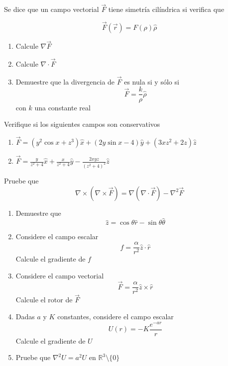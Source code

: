 \np

Se dice que un campo vectorial $\Vec{F}$ tiene simetría cilíndrica si verifica que

\[\Vec{F}(\Vec{r}) = F(\rho)\hat{\rho}\]

\begin{enumerate}[label=\alph*)]
    \item Calcule $\nabla\Vec{F}$
    \item Calcule $\nabla\cdot\Vec{F}$
    \item Demuestre que la divergencia de $\Vec{F}$ es nula si y sólo si
    \[\Vec{F}= \frac{k}{\rho}\hat{\rho}\]
    con $k$ una constante real
\end{enumerate}

\np

Verifique si los siguientes campos son conservativos

\begin{enumerate}[label=\alph*)]
    \item $\Vec{F} = (y^2\cos{x}+z^3)\hat{x} + (2y\sin{x}-4)\hat{y} + (3xz^2+2z)\hat{z}$
    \item $\Vec{F} = \frac{y}{z^2+4}\hat{x} + \frac{x}{z^2+4}\hat{y} - \frac{2xyz}{(z^2+4)^2}\hat{z}$
\end{enumerate}%

\np

Pruebe que 
\[\nabla\times(\nabla\times\Vec{F}) = \nabla(\nabla\cdot\Vec{F})-\nabla^2\Vec{F}\]

\np

\begin{enumerate}[label=\alph*)]
    \item Demuestre que
    \[\hat{z}=\cos{\theta}\hat{r}-\sin{\theta}\hat{\theta}\]
    \item Considere el campo escalar
    \[f = \frac{\alpha}{r^2}\hat{z}\cdot\hat{r}\]
    Calcule el gradiente de $f$
    \item Considere el campo vectorial
    \[\Vec{F}=\frac{\alpha}{r^2}\hat{z}\times\hat{r}\]
    Calcule el rotor de $\Vec{F}$
    \item Dadas $a$ y $K$ constantes, considere el campo escalar
    \[U(r) = -K\frac{e^{-ar}}{r}\]
    Calcule el gradiente de $U$
    \item Pruebe que $\nabla^2 U= a^2U$ en $\mathbb{R}^3\setminus\{0\}$
\end{enumerate}

\np

